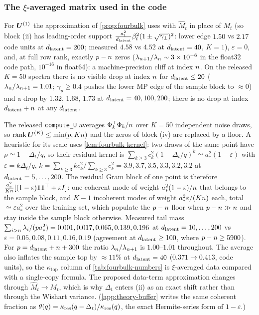 \subsubsection{The $\xi$-averaged matrix used in the code}

\begin{remark}\label{rem:fourbulk-singlecopy}
For $\bm{U}^{(1)}$ the approximation of \cref{prop:fourbulk} uses with $\hat M_t$ in place of $M_t$ (so block (ii) has leading-order support $\tfrac{a_1^2}{d_{\mathrm{latent}}}\beta_t^2(1\pm\sqrt{\gamma_\perp})^2$: lower edge $1.50$ vs $2.17$ code units at $d_{\mathrm{latent}}=200$; measured $4.58$ vs $4.52$ at $d_{\mathrm{latent}}=40$, $K=1$), $\varepsilon=0$, and, at full row rank, exactly $p-n$ zeros ($\lambda_{n+1}/\lambda_n\sim3\times10^{-6}$ in the float32 code path, $10^{-16}$ in float64): a machine-precision cliff at index $n$. On the released $K=50$ spectra there is no visible drop at index $n$ for $d_{\mathrm{latent}}\le20$ ($\lambda_n/\lambda_{n+1}=1.01$; $\gamma_p\ge0.4$ pushes the lower MP edge of the sample block to $\approx0$) and a drop by $1.32$, $1.68$, $1.73$ at $d_{\mathrm{latent}}=40,100,200$; there is no drop at index $d_{\mathrm{latent}}+n$ at any $d_{\mathrm{latent}}$.
\end{remark}
The released \texttt{compute\_U} averages $\Phi_k^\top\Phi_k/n$ over $K=50$ independent noise draws, so $\operatorname{rank}\bm{U}^{(K)}\le\min(p,Kn)$ and the zeros of block (iv) are replaced by a floor. A heuristic for its scale uses \cref{lem:fourbulk-kernel}: two draws of the same point have $\rho\simeq1-\Delta_t/q$, so their residual kernel is $\sum_{k\ge3}c_k^2(1-\Delta_t/q)^k\simeq a_*^2(1-\varepsilon)$ with $\varepsilon=\bar k\Delta_t/q$, $\bar k=\sum_{k\ge3}kc_k^2/\sum_{k\ge3}c_k^2=3.9,3.7,3.5,3.3,3.2,3.2$ at $d_{\mathrm{latent}}=5,\dots,200$. The residual Gram block of one point is therefore $\tfrac{a_*^2}{Kn}[(1-\varepsilon)\mathbf 1\mathbf 1^\top+\varepsilon I]$: one coherent mode of weight $a_*^2(1-\varepsilon)/n$ that belongs to the sample block, and $K-1$ incoherent modes of weight $a_*^2\varepsilon/(Kn)$ each, total $\simeq\varepsilon a_*^2$ over the training set, which populate the $p-n$ floor when $p-n\gg n$ and stay inside the sample block otherwise. Measured tail mass $\sum_{i>n}\lambda_i/(p a_*^2)=0.001,0.017,0.065,0.139,0.196$ at $d_{\mathrm{latent}}=10,\dots,200$ vs $\varepsilon=0.05,0.08,0.11,0.16,0.19$ (agreement at $d_{\mathrm{latent}}\ge100$, where $p-n\ge5900$). For $p=d_{\mathrm{latent}}+n+300$ the ratio $\lambda_n/\lambda_{n+1}$ is $1.00$--$1.01$ throughout. The average also inflates the sample top by $\approx11\%$ at $d_{\mathrm{latent}}=40$ ($0.371\to0.413$, code units), so the $\kappa_{\mathrm{top}}$ column of \cref{tab:fourbulk-numbers} is $\xi$-averaged data compared with a single-copy formula. The proposed data-term approximation changes through $\hat M_t\to M_t$, which is why $\Delta_t$ enters (ii) as an exact shift rather than through the Wishart variance. (\cref{app:theory-buffer} writes the same coherent fraction as $\theta(q)=\kappa_{\rm res}(q-\Delta_t)/\kappa_{\rm res}(q)$, the exact Hermite-series form of $1-\varepsilon$.)

